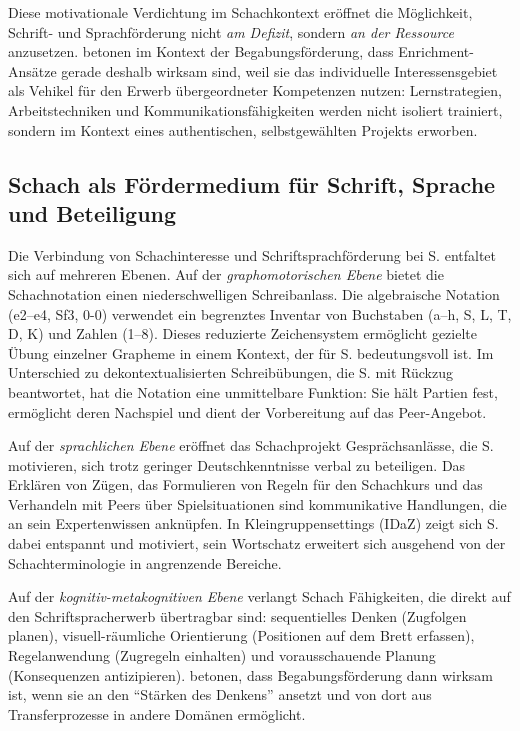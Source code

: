 \documentclass[ngerman, a4paper]{article}
\begin{document}
Diese motivationale Verdichtung im Schachkontext eröffnet die Möglichkeit, Schrift-
und Sprachförderung nicht \textit{am Defizit}, sondern \textit{an der Ressource} anzusetzen.
\textcite[S.\,254--273]{fischer2020begabungsfoerderung} betonen im Kontext der Begabungsförderung, dass Enrichment-Ansätze
gerade deshalb wirksam sind, weil sie das individuelle Interessensgebiet als Vehikel
für den Erwerb übergeordneter Kompetenzen nutzen: Lernstrategien, Arbeitstechniken
und Kommunikationsfähigkeiten werden nicht isoliert trainiert, sondern im Kontext
eines authentischen, selbstgewählten Projekts erworben.

\subsection{Schach als Fördermedium für Schrift, Sprache und Beteiligung}

Die Verbindung von Schachinteresse und Schriftsprachförderung bei S. entfaltet sich
auf mehreren Ebenen. Auf der \textit{graphomotorischen Ebene} bietet die Schachnotation
einen niederschwelligen Schreibanlass. Die algebraische Notation (e2--e4, Sf3, 0-0)
verwendet ein begrenztes Inventar von Buchstaben (a--h, S, L, T, D, K) und Zahlen
(1--8). Dieses reduzierte Zeichensystem ermöglicht gezielte Übung einzelner Grapheme
in einem Kontext, der für S. bedeutungsvoll ist. Im Unterschied zu dekontextualisierten
Schreibübungen, die S. mit Rückzug beantwortet, hat die Notation eine unmittelbare
Funktion: Sie hält Partien fest, ermöglicht deren Nachspiel und dient der Vorbereitung
auf das Peer-Angebot.

Auf der \textit{sprachlichen Ebene} eröffnet das Schachprojekt Gesprächsanlässe, die
S. motivieren, sich trotz geringer Deutschkenntnisse verbal zu beteiligen. Das
Erklären von Zügen, das Formulieren von Regeln für den Schachkurs und das
Verhandeln mit Peers über Spielsituationen sind kommunikative Handlungen, die an
sein Expertenwissen anknüpfen. In Kleingruppensettings (IDaZ) zeigt sich S. dabei
entspannt und motiviert, sein Wortschatz erweitert sich ausgehend von der
Schachterminologie in angrenzende Bereiche.

Auf der \textit{kognitiv-metakognitiven Ebene} verlangt Schach Fähigkeiten, die
direkt auf den Schriftspracherwerb übertragbar sind: sequentielles Denken
(Zugfolgen planen), visuell-räumliche Orientierung (Positionen auf dem Brett
erfassen), Regelanwendung (Zugregeln einhalten) und vorausschauende Planung
(Konsequenzen antizipieren). \textcite[S.\,112--113]{hoyer2013begabung} betonen, dass
Begabungsförderung dann wirksam ist, wenn sie an den
\enquote{Stärken des Denkens} ansetzt und von dort aus Transferprozesse
in andere Domänen ermöglicht.
\end{document}
